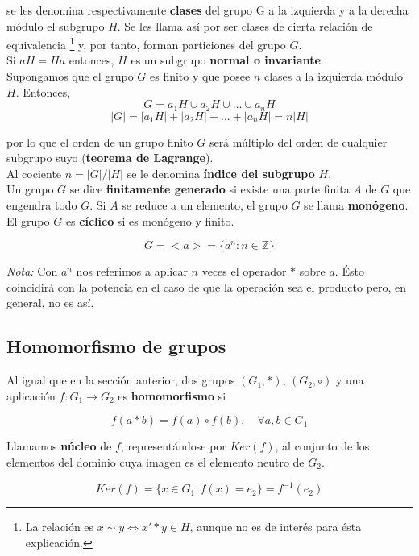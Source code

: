 \documentclass[0_algebra.tex]{subfiles}
\begin{document}
se les denomina respectivamente \textbf{clases} del grupo G a la izquierda y a la derecha módulo el subgrupo $H$. Se les llama así por ser clases de cierta relación de equivalencia \footnote{La relación es $x\sim y \Leftrightarrow x'*y \in H$, aunque no es de interés para ésta explicación.} y, por tanto, forman particiones del grupo $G$.\\

Si $aH=Ha$ entonces, $H$ es un subgrupo \textbf{normal o invariante}.\\

Supongamos que el grupo $G$ es finito y que posee $n$ clases a la izquierda módulo $H$. Entonces,
$$
G=a_1H \cup a_2H \cup \dots \cup a_nH
$$
$$
|G|=|a_1H|+|a_2H|+ \dots +|a_nH|=n|H|
$$

por lo que el orden de un grupo finito $G$ será múltiplo del orden de cualquier subgrupo suyo (\textbf{teorema de Lagrange}).\\

Al cociente $n=|G|/|H|$ se le denomina \textbf{índice del subgrupo} $H$.\\

Un grupo $G$ se dice \textbf{finitamente generado} si existe una parte finita $A$ de $G$ que engendra todo $G$. Si $A$ se reduce a un elemento, el grupo $G$ se llama \textbf{monógeno}.\\

El grupo $G$ es \textbf{cíclico} si es monógeno y finito.

$$
G=<a>=\lbrace a^n : n \in \mathbb{Z} \rbrace
$$

\emph{Nota:} Con $a^n$ nos referimos a aplicar $n$ veces el operador $*$ sobre $a$. Ésto coincidirá con la potencia en el caso de que la operación sea el producto pero, en general, no es así.

\subsection*{Homomorfismo de grupos}
Al igual que en la sección anterior, dos grupos $(G_1,*)$, $(G_2,\circ)$ y una aplicación $f:G_1 \rightarrow G_2$ es \textbf{homomorfismo} si

$$
f(a*b)=f(a)\circ f(b), \quad \forall a,b \in G_1
$$

Llamamos \textbf{núcleo} de $f$, representándose por $Ker(f)$, al conjunto de los elementos del dominio cuya imagen es el elemento neutro de $G_2$.

$$
Ker(f)=\lbrace x\in G_1 : f(x)=e_2 \rbrace = f^{-1}(e_2)
$$
\end{document}
